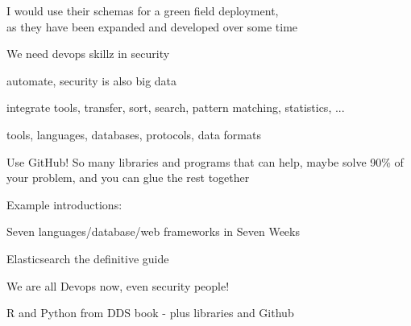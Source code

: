 \documentclass[Screen16to9,17pt]{foils}
\begin{document}
\begin{list2}
\item I would use their schemas for a green field deployment,\\
as they have been expanded and developed over some time
\end{list2}




\begin{list1}
\item
\end{list1}






\begin{list1}
\item We need devops skillz in security
\item automate, security is also big data
\item integrate tools, transfer, sort, search, pattern matching, statistics, ...
\item tools, languages, databases, protocols, data formats
\item Use GitHub! So many libraries and programs that can help, maybe solve  90\% of your problem, and you can glue the rest together
\item Example introductions:
\begin{list2}
\item Seven languages/database/web frameworks in Seven Weeks
\item Elasticsearch the definitive guide
\end{list2}
\end{list1}

\centerline{We are all Devops now, even security people!}

\slide{}


\begin{quote}

\end{quote}

\begin{list2}
  \item R and Python from DDS book
  - plus libraries and Github

\end{list2}
\end{document}
